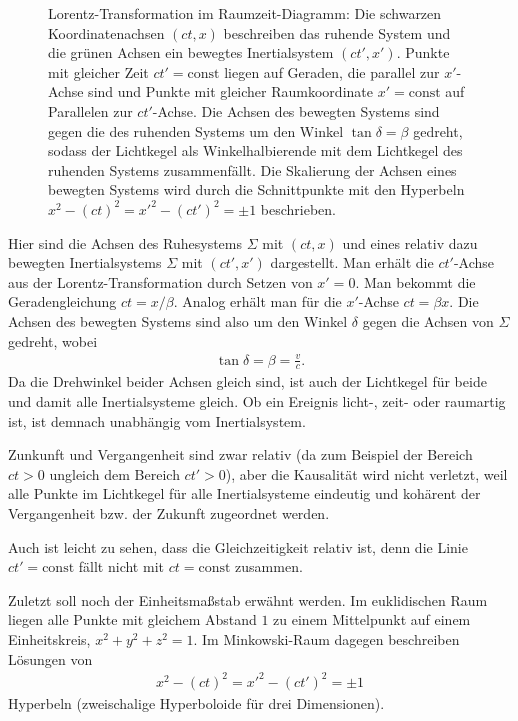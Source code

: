 \begin{figure}[htp]
    \centering
    \tfigMinkowskiDiagramB
    \caption{Lorentz-Transformation im Raumzeit-Diagramm: Die schwarzen Koordinatenachsen $(ct,x)$ beschreiben das ruhende System und die grünen Achsen ein bewegtes Inertialsystem $(ct',x')$.
    Punkte mit gleicher Zeit $ct'=\mathrm{const}$ liegen auf Geraden, die parallel zur $x'$-Achse sind und Punkte mit gleicher Raumkoordinate $x'=\mathrm{const}$ auf Parallelen zur $ct'$-Achse.
    Die Achsen des bewegten Systems sind gegen die des ruhenden Systems um den Winkel $\tan\delta=\beta$ gedreht, sodass der Lichtkegel als Winkelhalbierende mit dem Lichtkegel des ruhenden Systems zusammenfällt.
    Die Skalierung der Achsen eines bewegten Systems wird durch die Schnittpunkte mit den Hyperbeln $x^2-(ct)^2={x'}^2-(ct')^2=\pm1$ beschrieben. }
    \label{fig:minkowski_diagramB}
\end{figure}

Hier sind die Achsen des Ruhesystems $\Sigma$ mit $(ct,x)$ und eines relativ dazu bewegten Inertialsystems $\Sigma$ mit $(ct',x')$ dargestellt.
Man erhält die $ct'$-Achse aus der Lorentz-Transformation durch Setzen von $x'=0$. Man bekommt die Geradengleichung $ct=x/\beta$.
Analog erhält man für die $x'$-Achse $ct=\beta x$.
Die Achsen des bewegten Systems sind also um den Winkel $\delta$ gegen die Achsen von $\Sigma$ gedreht, wobei
\begin{align*}
    \tan\delta=\beta=\frac{v}{c}.
\end{align*}
Da die Drehwinkel beider Achsen gleich sind, ist auch der Lichtkegel für beide und damit alle Inertialsysteme gleich.
Ob ein Ereignis licht-, zeit- oder raumartig ist, ist demnach unabhängig vom Inertialsystem.

Zunkunft und Vergangenheit sind zwar relativ (da zum Beispiel der Bereich $ct>0$ ungleich dem Bereich $ct'>0$), aber die Kausalität wird nicht verletzt,
weil alle Punkte im Lichtkegel für alle Inertialsysteme eindeutig und kohärent der Vergangenheit bzw. der Zukunft zugeordnet werden.

Auch ist leicht zu sehen, dass die Gleichzeitigkeit relativ ist, denn die Linie $ct'=\mathrm{const}$ fällt nicht mit $ct=\mathrm{const}$ zusammen.

Zuletzt soll noch der Einheitsmaßstab erwähnt werden.
Im euklidischen Raum liegen alle Punkte mit gleichem Abstand $1$ zu einem Mittelpunkt auf einem Einheitskreis, $x^2+y^2+z^2=1$.
Im Minkowski-Raum dagegen beschreiben Lösungen von
\begin{align*}
    x^2-(ct)^2={x'}^2-(ct')^2=\pm1
\end{align*}
Hyperbeln (zweischalige Hyperboloide für drei Dimensionen).
